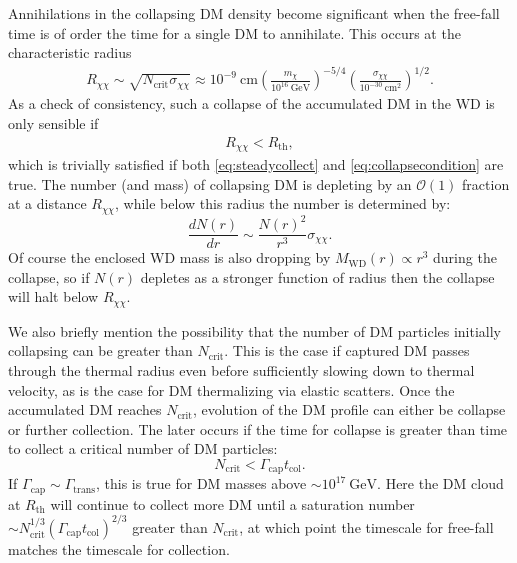 \documentclass[preprintnumbers,amsmath,amssymb,prd,superscriptaddress]{revtex4}
\newcommand{\OO}{\mathcal{O}}
\newcommand{\GeV}{\text{GeV}}
\newcommand{\cm}{\text{cm}}
\def\r{\right)}
\def\l{\left(}
\begin{document}
Annihilations in the collapsing DM density become significant when the free-fall time is of order the time for a single DM to annihilate.
This occurs at the characteristic radius
\begin{align}
R_{\chi \chi} \sim \sqrt{N_\text{crit} \sigma_{\chi \chi}} \approx 10^{-9} ~\cm  \l \frac{m_\chi}{10^{16} ~\GeV} \r^{-5/4} \l \frac{\sigma_{\chi \chi}}{10^{-30} ~\cm^2} \r^{1/2}. 
\end{align}
As a check of consistency, such a collapse of the accumulated DM in the WD is only sensible if
\begin{align}
\label{eq:xicondition}
R_{\chi \chi} < R_\text{th},
\end{align}
which is trivially satisfied if both \eqref{eq:steadycollect} and \eqref{eq:collapsecondition} are true. 
The number (and mass) of collapsing DM is depleting by an $\OO(1)$ fraction at a distance $R_{\chi \chi}$, while below this radius the number is determined by:
\begin{equation}
\frac{dN(r)}{dr} \sim \frac{N(r)^2}{r^3} \sigma_{\chi \chi}.
\end{equation}
Of course the enclosed WD mass is also dropping by $M_\text{WD}(r) \propto r^3$ during the collapse, so if $N(r)$ depletes as a stronger function of radius then the collapse will halt below $R_{\chi \chi}$. 

We also briefly mention the possibility that the number of DM particles initially collapsing can be greater than $N_\text{crit}$. 
This is the case if captured DM passes through the thermal radius even before sufficiently slowing down to thermal velocity, as is the case for DM thermalizing via elastic scatters. 
Once the accumulated DM reaches $N_\text{crit}$, evolution of the DM profile can either be collapse or further collection.
The later occurs if the time for collapse is greater than time to collect a critical number of DM particles:
\begin{equation}
N_\text{crit} < \Gamma_\text{cap} t_\text{col}.
\end{equation}
If $\Gamma_\text{cap} \sim \Gamma_\text{trans}$, this is true for DM masses above $\sim 10^{17} ~\GeV$. 
Here the DM cloud at $R_\text{th}$ will continue to collect more DM until a saturation number $\sim N_\text{crit}^{1/3} (\Gamma_\text{cap} t_\text{col})^{2/3}$ greater than $N_\text{crit}$, at which point the timescale for free-fall matches the timescale for collection.
\end{document}
